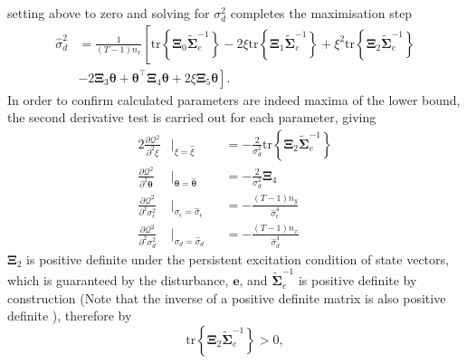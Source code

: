\documentclass[]{article}
\begin{document}
setting above to zero and solving for $\sigma_d^2$ completes the maximisation step
\begin{align}\label{eq:sigmadhat}
\hat{\sigma}_d^2&=\frac{1}{(T-1)n_x}\left[ \mathrm{tr}\left\lbrace \boldsymbol\Xi_0 \tilde{\boldsymbol\Sigma}_e^{-1}\right\rbrace-
2\xi\mathrm{tr}\left\lbrace \boldsymbol\Xi_1 \tilde{\boldsymbol\Sigma}_e^{-1}\right\rbrace +\xi^2\mathrm{tr} \left\lbrace\boldsymbol\Xi_2\tilde{\boldsymbol\Sigma}_e^{-1}\right\rbrace\right.\nonumber \\ &\left.-2\boldsymbol\Xi_3\boldsymbol\theta+\boldsymbol\theta^\top\boldsymbol \Xi_4\boldsymbol\theta+2\xi\boldsymbol\Xi_5 \boldsymbol\theta\right].
\end{align}
In order to confirm calculated parameters are indeed maxima of the lower bound, the second derivative test is carried out for each parameter, giving
\begin{alignat}{2}%
 \frac{\partial \mathcal Q^2}{\partial^2\xi}&\biggr\rvert_{\xi=\hat{\xi}}&&=-\frac{2}{\sigma_d^2}\mathrm{tr}\left\lbrace \boldsymbol\Xi_2 \tilde{\boldsymbol\Sigma}_e^{-1}\right\rbrace \label{eq:SecondDerivativexi}\\
 \frac{\partial \mathcal Q^2}{\partial^2\boldsymbol\theta}&\biggr\rvert_{\boldsymbol\theta=\hat{\boldsymbol\theta}}&&=-\frac{2}{\sigma_d^2}\boldsymbol\Xi_4 \label{eq:SecondDerivativetheta} \\
 \frac{\partial \mathcal Q^2}{\partial^2\sigma_{\epsilon}^2}&\biggr\rvert_{\sigma_{\epsilon}=\hat{\sigma}_{\epsilon}}&&=-\frac{(T-1)n_y}{\hat{\sigma}_{\epsilon}^4} \label{eq:SecondDerivativenoise} \\
 \frac{\partial \mathcal Q^2}{\partial^2\sigma_{d}^2}&\biggr\rvert_{{\sigma}_{d}=\hat{\sigma}_{d}}&&= -\frac{(T-1)n_x}{\hat{\sigma}_{d}^4} \label{eq:SecondDerivativedisturbance}
\end{alignat}
$\boldsymbol\Xi_2$ is positive definite under the persistent excitation condition of state vectors, which is guaranteed by the disturbance, $\mathbf e$, and $\tilde{\boldsymbol\Sigma}_e^{-1}$ is positive definite by construction (Note that the inverse of a positive definite matrix is also positive definite \cite{Horn2005}), therefore by \cite{Coope1994}
\begin{equation}
 \mathrm{tr}\left\lbrace \boldsymbol\Xi_2 \tilde{\boldsymbol\Sigma}_e^{-1}\right\rbrace >0,
\end{equation}
\end{document}
